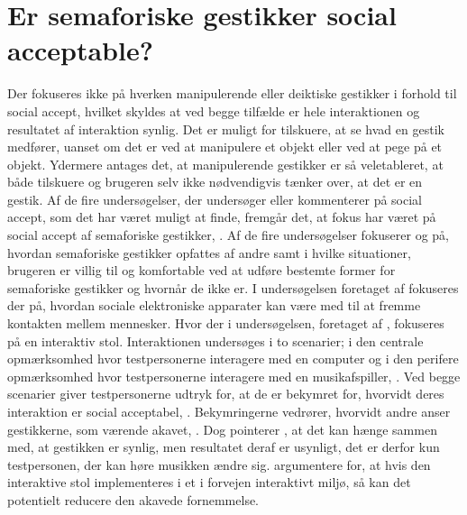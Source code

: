 \section{Er semaforiske gestikker social acceptable?}
\label{Socialaccept}
%            
Der fokuseres ikke på hverken manipulerende eller deiktiske gestikker i forhold til social accept, hvilket skyldes at ved begge tilfælde er hele interaktionen og resultatet af interaktion synlig. Det er muligt for tilskuere, at se hvad en gestik medfører, uanset om det er ved at manipulere et objekt eller ved at pege på et objekt. Ydermere antages det, at manipulerende gestikker er så veletableret, at både tilskuere og brugeren selv ikke nødvendigvis tænker over, at det er en gestik. \blankline
%
Af de fire undersøgelser, der undersøger eller kommenterer på social accept, som det har været muligt at finde, fremgår det, at fokus har været på social accept af semaforiske gestikker, \parencite{PDF:AChairAsUbiquitousInputDevice, PDF:WouldYouDoThat, PDF:AreYouComfortableDoingThat, PDF:AnExploratoryStudy}. Af de fire undersøgelser fokuserer \textcite{PDF:AreYouComfortableDoingThat} og \textcite{PDF:WouldYouDoThat} på, hvordan semaforiske gestikker opfattes af andre samt i hvilke situationer, brugeren er villig til og komfortable ved at udføre bestemte former for semaforiske gestikker og hvornår de ikke er. I undersøgelsen foretaget af \textcite{PDF:AnExploratoryStudy} fokuseres der på, hvordan sociale elektroniske apparater kan være med til at fremme kontakten mellem mennesker. Hvor der i undersøgelsen, foretaget af \textcite{PDF:AChairAsUbiquitousInputDevice}, fokuseres på en interaktiv stol. Interaktionen undersøges i to scenarier; i den centrale opmærksomhed hvor testpersonerne interagere med en computer og i den perifere opmærksomhed hvor testpersonerne interagere med en musikafspiller, \parencite{PDF:AChairAsUbiquitousInputDevice}. Ved begge scenarier giver testpersonerne udtryk for, at de er bekymret for, hvorvidt deres interaktion er social acceptabel, \parencite[s. 8]{PDF:AChairAsUbiquitousInputDevice}. Bekymringerne vedrører, hvorvidt andre anser gestikkerne, som værende akavet, \parencite[s. 4]{PDF:AChairAsUbiquitousInputDevice}. Dog pointerer \textcite[s. 9]{PDF:AChairAsUbiquitousInputDevice}, at det kan hænge sammen med, at gestikken er synlig, men resultatet deraf er usynligt, det er derfor kun testpersonen, der kan høre musikken ændre sig. \textcite[s. 9]{PDF:AChairAsUbiquitousInputDevice} argumentere for, at hvis den interaktive stol implementeres i et i forvejen interaktivt miljø, så kan det potentielt reducere den akavede fornemmelse.\blankline
